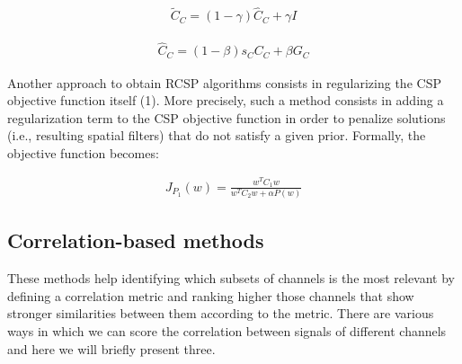 \documentclass{Configuration_Files/PoliMi3i_thesis}
\begin{document}
\begin{align}
	\tilde{C}_{C} = (1 - \gamma) \hat{C}_{C} + \gamma I
	\label{eq:RCSP1}
\end{align}

\begin{align}
	\hat{C}_{C} = (1 - \beta) {s}_{C} {C}_{C} + \beta {G}_{C}
	\label{eq:RCSP2}
\end{align}



Another approach to obtain RCSP algorithms consists in regularizing the CSP objective function itself (1). More precisely, such a method consists in adding a regularization term to the CSP objective function in order to penalize solutions (i.e., resulting spatial filters) that do not satisfy a given prior. Formally, the objective function becomes:

\begin{align}
	{J}_{P_{1}}(w) = \frac{w^{T}C_{1}w}{w^{T}C_{2}w + \alpha P(w)}
	\label{eq:RCSP3}
\end{align}




\subsection{Correlation-based methods}

These methods help identifying which subsets of channels is the most relevant by defining a correlation metric and ranking higher those channels that show stronger similarities between them according to the metric.
There are various ways in which we can score the correlation between signals of different channels and here we will briefly present three.
\end{document}
